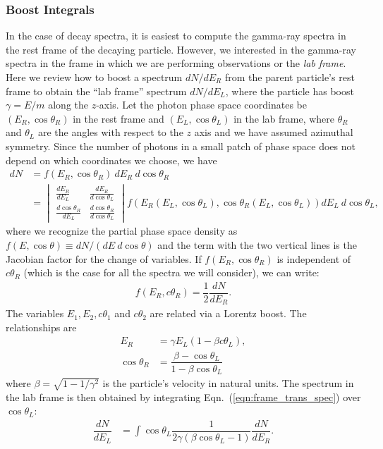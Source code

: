 \documentclass[review]{elsarticle}
\begin{document}
\subsubsection{Boost Integrals}
In the case of decay spectra, it is easiest to compute the gamma-ray spectra in the rest frame of the decaying particle. However, we interested in the gamma-ray spectra in the frame in which we are performing observations or the \textit{lab frame}. Here we review how to boost a spectrum $dN/dE_R$ from the parent particle's rest frame to obtain the ``lab frame'' spectrum $dN/dE_L$, where the particle has boost $\gamma = E / m$ along the $z$-axis. Let the photon phase space coordinates be $(E_R, \cos\theta_R)$ in the rest frame and $(E_L, \cos\theta_L)$ in the lab frame, where $\theta_R$ and $\theta_L$ are the angles with respect to the $z$ axis and we have assumed azimuthal symmetry. Since the number of photons in a small patch of phase space does not depend on which coordinates we choose, we have
\begin{align}\label{eqn:frame_trans_spec}
    dN &= f(E_R, \cos \theta_R)\ dE_R\ d\cos\theta_R\\
       &= \begin{vmatrix}
            \frac{dE_R}{dE_L} & \frac{dE_R}{d\cos\theta_L}\\
            \frac{d\cos\theta_R}{dE_L} & \frac{d\cos\theta_R}{d\cos\theta_L}
        \end{vmatrix} f(E_R(E_L, \cos\theta_L), \cos\theta_R(E_L, \cos\theta_L)) dE_L\ d\cos\theta_L,
\end{align}
where we recognize the partial phase space density as $f(E, \cos\theta) \equiv dN/(dE\ d\cos\theta)$ and the term with the two vertical lines is the Jacobian factor for the change of variables. If \(f(E_R, \cos\theta_R)\) is independent of \(c\theta_R\) (which is the case for all the spectra we will consider), we can write:
\begin{align}
  f(E_{R}, c\theta_{R}) = \dfrac{1}{2}\dfrac{dN}{dE_{R}}.
\end{align}
The variables \(E_{1}, E_{2}, c\theta_{1}\) and \(c\theta_{2}\) are related via a Lorentz boost. The relationships are
\begin{align}
  E_R &= \gamma E_L (1 - \beta c\theta_L),\\
  \cos\theta_R &= \dfrac{\beta - \cos\theta_L}{1 - \beta \cos\theta_L}
\end{align}
where \(\beta = \sqrt{1 - 1 / \gamma^2}\) is the particle's velocity in natural units. The spectrum in the lab frame is then obtained by integrating Eqn.~(\ref{eqn:frame_trans_spec}) over \(\cos\theta_L\):
\begin{align}\label{eq:spec_boost}
  \dfrac{dN}{dE_L} & = \int \cos\theta_L\dfrac{1}{2\gamma(\beta \cos\theta_L - 1)}\dfrac{dN}{dE_R}.
\end{align}
\end{document}
